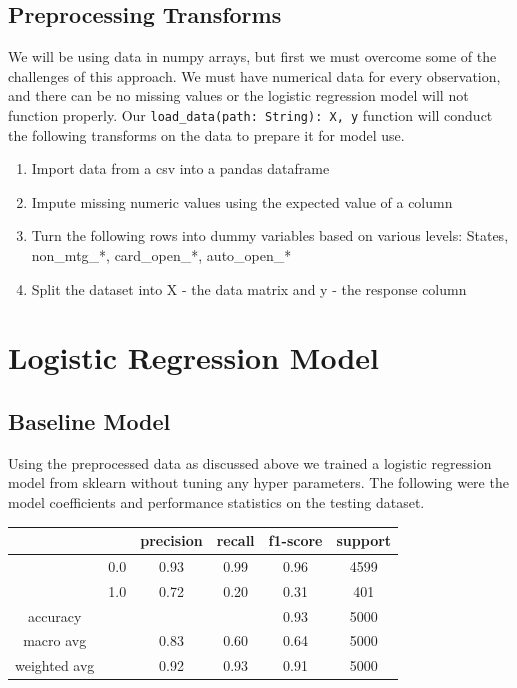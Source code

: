 \documentclass[12pt]{article}
\begin{document}
	\subsection{Preprocessing Transforms}
	
	We will be using data in numpy arrays, but first we must overcome some of the challenges of this approach. We must have numerical data for every observation, and there can be no missing values or the logistic regression model will not function properly. Our \verb|load_data(path: String): X, y| function will conduct the following transforms on the data to prepare it for model use. 
	
	\begin{enumerate}
		\item Import data from a csv into a pandas dataframe
		\item Impute missing numeric values using the expected value of a column
		\item Turn the following rows into dummy variables based on various levels: States, non\_mtg\_*, card\_open\_*, auto\_open\_*
		\item Split the dataset into X - the data matrix and y - the response column
	\end{enumerate}
	
	\section{Logistic Regression Model}
	
	\subsection{Baseline Model}
	
	Using the preprocessed data as discussed above we trained a logistic regression model from sklearn without tuning any hyper parameters. 
	The following were the model coefficients and performance statistics on the testing dataset. 
	

	\begin{tabular}{c|c|c|c|c|c}
	\hline
			& 		& 	precision &  recall  & f1-score   & support \\ \hline
			
			&  0.0	  &		0.93 &     0.99   &  0.96    &  4599 \\ \hline
			&  1.0    &		0.72 &     0.20   &   0.31   &    401 \\ \hline
			
			accuracy & & & &                       					0.93     & 5000 \\ \hline
			macro avg  & &   				0.83   &   0.60  &    0.64  &    5000  \\ \hline
			weighted avg  & &   			0.92   &   0.93  &    0.91   &   5000 \\ \hline
	\end{tabular}					
\end{document}
